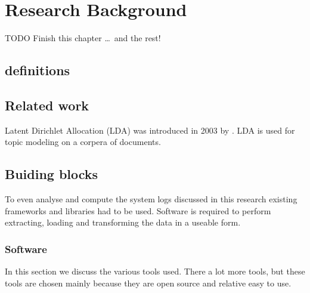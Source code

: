 \chapter{Research Background}  \label{ch:theory}

TODO Finish this chapter \ldots\ and the rest!


\section{definitions}

\section{Related work}  
Latent Dirichlet Allocation (LDA) was introduced in 2003 by \cite{Blei2003LatentAllocation}. LDA is used for topic modeling on a corpera of documents. 

\section{Buiding blocks}
To even analyse and compute the system logs discussed in this research existing frameworks and libraries had to be used. Software is required to perform extracting, loading and transforming the data in a useable form.

\subsection{Software}
In this section we discuss the various tools used. There a lot more tools, but these tools are chosen mainly because they are open source and relative easy to use.

